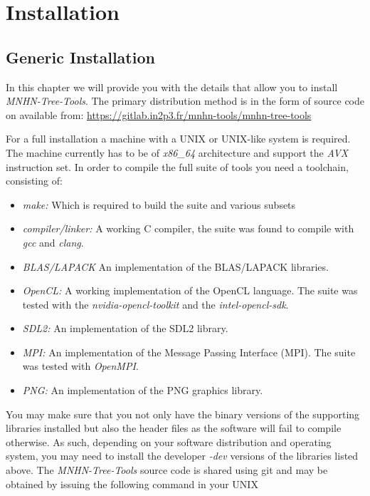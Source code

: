 \chapter{Installation}

\section{Generic Installation} \label{sec-inst-generic}

In this chapter we will provide you with the details that allow you to
install \emph{MNHN-Tree-Tools}. The primary distribution method is in the
form of source code on available from: \newline
\url{https://gitlab.in2p3.fr/mnhn-tools/mnhn-tree-tools} \newline

For a full installation a machine with a UNIX or UNIX-like system
is required. The machine currently has to be of \emph{x86\_64}
architecture and support the \emph{AVX} instruction set. In order to
compile the full suite of tools you need a toolchain, consisting of:
\begin{itemize}
\item \emph{make:} Which is required to build the suite and various subsets
\item \emph{compiler/linker:} A working C compiler, the suite was found to
  compile with \emph{gcc} and \emph{clang}.
\item \emph{BLAS/LAPACK} An implementation of the BLAS/LAPACK
  libraries.
\item \emph{OpenCL:} A working implementation of the OpenCL
  language. The suite was tested with the
  \emph{nvidia-opencl-toolkit} and the \emph{intel-opencl-sdk}.
\item \emph{SDL2:} An implementation of the SDL2 library.
\item \emph{MPI:} An implementation of the Message Passing Interface
  (MPI). The suite was tested with \emph{OpenMPI}.
\item \emph{PNG:} An implementation of the PNG graphics library.
\end{itemize}
You may make sure that you not only have the binary versions of the
supporting libraries installed but also the header files as the
software will fail to compile otherwise. As such, depending on your
software distribution and operating system, you may need to
install the developer \emph{-dev} versions of the libraries listed
above. The \emph{MNHN-Tree-Tools} source code is shared using git and
may be obtained by issuing the following command in your UNIX
